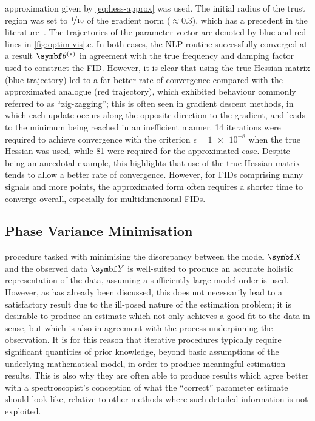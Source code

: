 approximation given by \cref{eq:hess-approx} was used. The initial
radius of the trust region was set to $\nicefrac{1}{10}$ of the gradient norm
($\approx 0.3$), which has a precedent in the literature~\cite{Gould2005}. The
trajectories of the parameter vector are denoted by blue and red lines in
\cref{fig:optim-vis}.c.
In both cases, the \ac{NLP} routine successfully converged at a result $\bthstar$
in agreement with the true frequency and damping factor used to construct the
\ac{FID}. However, it is clear that using the true Hessian matrix (blue trajectory)
led to a far better rate of convergence compared with the
approximated analogue (red trajectory), which exhibited behaviour commonly
referred to as ``zig-zagging''; this is often seen in gradient
descent methods, in which each update occurs along the opposite direction to
the gradient, and leads to the minimum being reached in an inefficient manner.
14 iterations were required to achieve convergence with the
criterion $\epsilon = \num[print-unity-mantissa=false]{1e-8}$
when the true Hessian was used, while 81 were required for the approximated
case. Despite being an anecdotal example, this highlights that use of the true
Hessian matrix tends to allow a better rate of convergence. However, for
\acp{FID} comprising many signals and more points, the approximated form
often requires a shorter time to converge overall, especially for
multidimensonal \acp{FID}.


\subsection{Phase Variance Minimisation}
\label{subsec:phase-variance}
 procedure tasked with minimising the discrepancy between the model
$\bX$ and the observed data $\bY$ is well-suited to produce an accurate
holistic
representation of the data, assuming a sufficiently large
model order is used. However, as has already been discussed, this does not
necessarily lead to a satisfactory result due to the ill-posed nature of the
estimation problem;
it is desirable to produce an estimate which not only achieves a good fit to
the data in  sense, but which is also in agreement with the process
underpinning the observation. It is for this reason that iterative procedures
typically require significant quantities of prior knowledge, beyond basic
assumptions of the underlying mathematical model, in order to produce
meaningful estimation
results.  This is also why they are often able to produce results which agree
better with a spectroscopist's conception of what the ``correct'' parameter
estimate should look like, relative to other methods where such detailed
information is not exploited.

